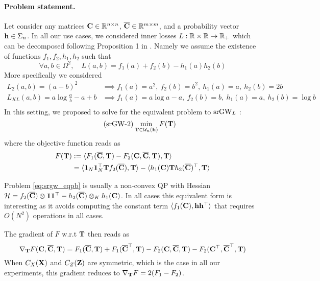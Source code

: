 \paragraph{Problem statement.} Let consider any matrices ${\mathbf{C}} \in \mathbb{R}^{n \times n}$, $\overline{{\mathbf{C}}} \in \mathbb{R}^{m \times m}$, and a probability vector ${\mathbf{h}} \in \Sigma_n$. In all our use cases,  we considered inner losses $L: \mathbb{R} \times \mathbb{R} \rightarrow \mathbb{R}_+$ which can be decomposed following Proposition 1 in \citep{peyre2016gromov}. Namely we assume the existence of functions $f_1, f_2, h_1, h_2$ such that 
\begin{equation}\label{eq:loss_decomposition}
\forall a, b \in \Omega^2, \quad L(a, b) = f_1(a) + f_2(b) - h_1(a) h_2(b)
\end{equation}
More specifically we considered
\begin{equation} \tag{L2}\label{eq:L2_loss}
\begin{split}
	L_2(a,b) = (a-b)^2 &\implies f_1(a) = a^2, \: f_2(b) = b^2, \: h_1(a) = a, \: h_2(b) = 2b \\
	L_{KL}(a,b ) = a \log \frac{a}{b} - a +b &\implies f_1(a) = a \log a -a, \: f_2(b) = b, \: h_1(a) = a, \: h_2(b) = \log b \\
\end{split}
\end{equation}
In this setting, we proposed to solve for the equivalent problem to $\operatorname{srGW}_L$ :
\begin{equation}\label{eq:srgw_eqpb}\tag{srGW-2}
\min_{{\mathbf{T}} \in \mathcal{U}_n({\mathbf{h}})} F({\mathbf{T}})
\end{equation}
where the objective function reads as 
\begin{equation}\label{eq:expressionF}
\begin{split}
	F({\mathbf{T}}) &:= \langle F_1(\overline{{\mathbf{C}}}, {\mathbf{T}}) - F_2({\mathbf{C}}, \overline{{\mathbf{C}}}, {\mathbf{T}}) , {\mathbf{T}} \rangle \\ 
	&= \langle \bm{1}_N \bm{1}_N^\top {\mathbf{T}} f_2(\overline{{\mathbf{C}}}) ,  {\mathbf{T}} \rangle - \langle h_1({\mathbf{C}}) {\mathbf{T}} h_2(\overline{{\mathbf{C}}})^\top , {\mathbf{T}} \rangle
\end{split}
\end{equation}

Problem \ref{eq:srgw_eqpb} is usually a non-convex QP with Hessian $\mathcal{H} = f_2(\overline{{\mathbf{C}}}) \otimes \bm{1}\bm{1}^\top - h_2(\overline{{\mathbf{C}}}) \otimes_K h_1({\mathbf{C}})$. In all cases this equivalent form is interesting as it avoids computing the constant term $\langle f_1({\mathbf{C}}) , {\mathbf{h}} {\mathbf{h}}^\top \rangle $ that requires $O(N^2)$ operations in all cases.

The gradient of $F$ w.r.t ${\mathbf{T}}$ then reads as 
\begin{equation}\label{eq:srgw_gradient}
\nabla_{{\mathbf{T}}} F({\mathbf{C}}, \overline{{\mathbf{C}}}, {\mathbf{T}}) = F_1(\overline{{\mathbf{C}}}, {\mathbf{T}}) +  F_1(\overline{{\mathbf{C}}}^\top, {\mathbf{T}}) - F_2({\mathbf{C}}, \overline{{\mathbf{C}}}, {\mathbf{T}}) -F_2({\mathbf{C}}^\top, \overline{{\mathbf{C}}}^\top, {\mathbf{T}}) 
\end{equation}
When $C_X({\mathbf{X}})$ and $C_Z({\mathbf{Z}})$ are symmetric, which is the case in all our experiments,  this gradient reduces to $\nabla_{{\mathbf{T}}} F = 2(F_1 - F_2)$.

